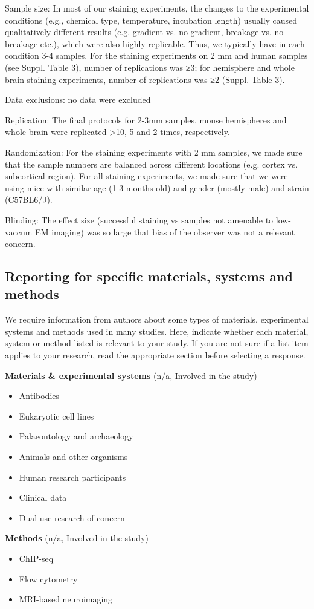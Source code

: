 \documentclass{article}
\begin{document}
\noindent Sample size: In most of our staining experiments, the changes to the experimental conditions (e.g., chemical type, temperature, incubation length) usually caused qualitatively different results (e.g. gradient vs. no gradient, breakage vs. no breakage etc.), which were also highly replicable. Thus, we typically have in each condition 3-4 samples. For the staining experiments on 2 mm and human samples (see Suppl. Table 3), number of replications was ≥3; for hemisphere and whole brain staining experiments, number of replications was ≥2 (Suppl. Table 3).

\noindent Data exclusions: no data were excluded

\noindent Replication: The final protocols for 2-3mm samples, mouse hemispheres and whole brain were replicated >10, 5 and 2 times, respectively.

\noindent Randomization: For the staining experiments with 2 mm samples, we made sure that the sample numbers are balanced across different locations (e.g. cortex vs. subcortical region). For all staining experiments, we made sure that we were using mice with similar age (1-3 months old) and gender (mostly male) and strain (C57BL6/J).

\noindent Blinding: The effect size (successful staining vs samples not amenable to low-vaccum EM imaging) was so large that bias of the observer was not a relevant concern.

\subsection*{Reporting for specific materials, systems and methods}
We require information from authors about some types of materials, experimental systems and methods used in many studies. Here, indicate whether each material, system or method listed is relevant to your study. If you are not sure if a list item applies to your research, read the appropriate section before selecting a response.

\noindent\textbf{Materials \& experimental systems} (n/a, Involved in the study)
\begin{itemize}
\item[{[x] [ ]}] Antibodies
\item[{[x] [ ]}] Eukaryotic cell lines
\item[{[x] [ ]}] Palaeontology and archaeology
\item[{[ ] [x]}] Animals and other organisms
\item[{[ ] [x]}] Human research participants
\item[{[x] [ ]}] Clinical data
\item[{[x] [ ]}] Dual use research of concern
\end{itemize}
\noindent\textbf{Methods} (n/a, Involved in the study)
\begin{itemize}
\item[{[x] [ ]}] ChIP-seq
\item[{[x] [ ]}] Flow cytometry
\item[{[x] [ ]}] MRI-based neuroimaging
\end{itemize}
\end{document}
